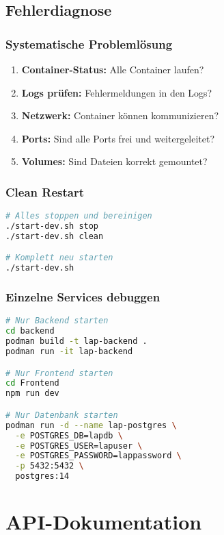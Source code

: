 \documentclass[a4paper,12pt]{article}
\begin{document}
\subsection{Fehlerdiagnose}

\subsubsection{Systematische Problemlösung}
\begin{enumerate}
    \item \textbf{Container-Status:} Alle Container laufen?
    \item \textbf{Logs prüfen:} Fehlermeldungen in den Logs?
    \item \textbf{Netzwerk:} Container können kommunizieren?
    \item \textbf{Ports:} Sind alle Ports frei und weitergeleitet?
    \item \textbf{Volumes:} Sind Dateien korrekt gemountet?
\end{enumerate}

\subsubsection{Clean Restart}
\begin{lstlisting}[language=bash]
# Alles stoppen und bereinigen
./start-dev.sh stop
./start-dev.sh clean

# Komplett neu starten
./start-dev.sh
\end{lstlisting}

\subsubsection{Einzelne Services debuggen}
\begin{lstlisting}[language=bash]
# Nur Backend starten
cd backend
podman build -t lap-backend .
podman run -it lap-backend

# Nur Frontend starten
cd Frontend
npm run dev

# Nur Datenbank starten
podman run -d --name lap-postgres \
  -e POSTGRES_DB=lapdb \
  -e POSTGRES_USER=lapuser \
  -e POSTGRES_PASSWORD=lappassword \
  -p 5432:5432 \
  postgres:14
\end{lstlisting}

\section{API-Dokumentation}
\end{document}
